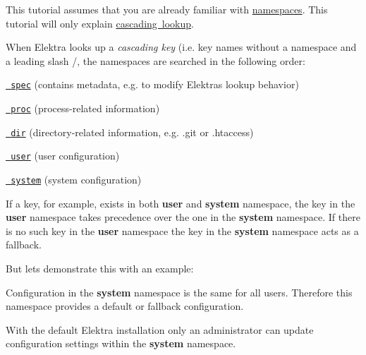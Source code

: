 This tutorial assumes that you are already familiar with \mbox{\hyperlink{doc_tutorials_namespaces_md}{namespaces}}. This tutorial will only explain \mbox{\hyperlink{doc_help_elektra-cascading_md}{cascading lookup}}.

When Elektra looks up a {\itshape cascading key} (i.\+e. key names without a namespace and a leading slash {\ttfamily /}, the namespaces are searched in the following order\+:


\begin{DoxyItemize}
\item \href{https://github.com/ElektraInitiative/libelektra/blob/master/doc/help/elektra-namespaces.md\#spec}{\texttt{ spec}} (contains metadata, e.\+g. to modify Elektra\textquotesingle{}s lookup behavior)
\item \href{https://github.com/ElektraInitiative/libelektra/blob/master/doc/help/elektra-namespaces.md\#proc}{\texttt{ proc}} (process-\/related information)
\item \href{https://github.com/ElektraInitiative/libelektra/blob/master/doc/help/elektra-namespaces.md\#dir}{\texttt{ dir}} (directory-\/related information, e.\+g. {\ttfamily .git} or {\ttfamily .htaccess})
\item \href{https://github.com/ElektraInitiative/libelektra/blob/master/doc/help/elektra-namespaces.md\#user}{\texttt{ user}} (user configuration)
\item \href{https://github.com/ElektraInitiative/libelektra/blob/master/doc/help/elektra-namespaces.md\#system}{\texttt{ system}} (system configuration)
\end{DoxyItemize}

If a key, for example, exists in both {\bfseries{user}} and {\bfseries{system}} namespace, the key in the {\bfseries{user}} namespace takes precedence over the one in the {\bfseries{system}} namespace. If there is no such key in the {\bfseries{user}} namespace the key in the {\bfseries{system}} namespace acts as a fallback.

But lets demonstrate this with an example\+:

Configuration in the {\bfseries{system}} namespace is the same for all users. Therefore this namespace provides a default or fallback configuration.

With the default Elektra installation only an administrator can update configuration settings within the {\bfseries{system}} namespace.


